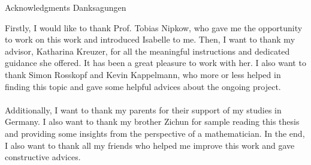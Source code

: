 \makeatletter
{}
{}
{}
\makeatother
\thispagestyle{empty}

\vspace*{20mm}

\begin{center}
\makeatletter
{}
{ Acknowledgments}
{ Danksagungen}
\makeatother
\end{center}

\vspace{10mm}

Firstly, I would like to thank Prof. Tobias Nipkow, who gave me the opportunity to work on this work 
and introduced Isabelle to me. Then, I want to thank my advisor, Katharina Kreuzer,
for all the meaningful instructions and dedicated guidance she offered. 
It has been a great pleasure to work with her. 
I also want to thank Simon Rosskopf and Kevin Kappelmann, who more or less helped in finding this topic 
and gave some helpful advices about the ongoing project. \\\\
Additionally, I want to thank my parents for their support of my studies in Germany. 
I also want to thank my brother Zichun for sample reading this thesis and providing some insights 
from the perspective of a mathematician. 
In the end, I also want to thank all my friends who helped me improve this work and gave constructive advices.

\cleardoublepage{}

